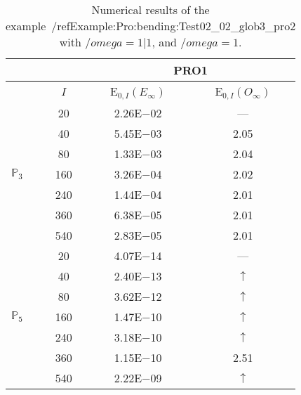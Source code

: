 \begin{table}[H]
\caption{Numerical results of the example~/ref{Example:Pro:bending:Test02_02_glob3_pro2} with $/omega=1|1$, and $/omega=1$.}
\setlength{\tabcolsep}{5pt}
\centering
\begin{tabular}{@{}l c c c@{}}
\toprule
 &  & \multicolumn{2}{c}{PRO1}\\
\midrule
 & $I$ & E$_{0,I}(E_{\infty})$ & E$_{0,I}(O_{\infty})$\\
\midrule
\multirow{7}{*}{$\mathbb{P}_{3}$}
 & 20 & 2.26E$-$02 & ---\\
 & 40 & 5.45E$-$03 & 2.05\\
 & 80 & 1.33E$-$03 & 2.04\\
 & 160 & 3.26E$-$04 & 2.02\\
 & 240 & 1.44E$-$04 & 2.01\\
 & 360 & 6.38E$-$05 & 2.01\\
 & 540 & 2.83E$-$05 & 2.01\\
\midrule
\multirow{7}{*}{$\mathbb{P}_{5}$}
 & 20 & 4.07E$-$14 & ---\\
 & 40 & 2.40E$-$13 & $\uparrow$\\
 & 80 & 3.62E$-$12 & $\uparrow$\\
 & 160 & 1.47E$-$10 & $\uparrow$\\
 & 240 & 3.18E$-$10 & $\uparrow$\\
 & 360 & 1.15E$-$10 & 2.51\\
 & 540 & 2.22E$-$09 & $\uparrow$\\
\bottomrule
\end{tabular}
\label{Table:PRO:test_02_02_test9_pro2}
\end{table}
